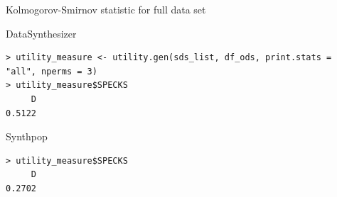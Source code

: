 \documentclass[xcolor=table]{beamer}
\begin{document}


\begin{frame}[fragile]{Kolmogorov-Smirnov statistic for full data set}

DataSynthesizer
\begin{lstlisting}[firstnumber=1, label=glabels, xleftmargin=10pt,frame=single] 
> utility_measure <- utility.gen(sds_list, df_ods, print.stats = "all", nperms = 3)
> utility_measure$SPECKS
     D 
0.5122 
\end{lstlisting}
Synthpop
\begin{lstlisting}[firstnumber=1, label=glabels, xleftmargin=10pt,frame=single] 
> utility_measure$SPECKS
     D 
0.2702 
\end{lstlisting}

\end{frame}
\end{document}
